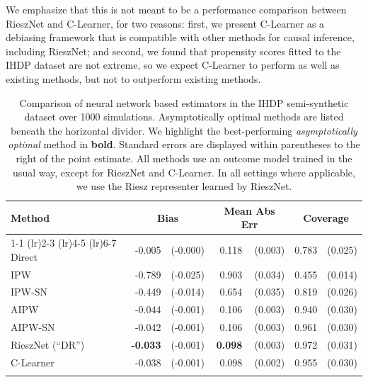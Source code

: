 We emphasize that this is not meant to be a performance comparison between RieszNet and C-Learner, for two reasons: first, we present C-Learner as a debiasing framework that is compatible with other methods for causal inference, including RieszNet; and second, we found that propensity scores fitted to the IHDP dataset are not extreme, so we expect C-Learner to perform as well as existing methods, but not to outperform existing methods. 

\begin{table}[H]
\centering
\footnotesize
\begin{tabular}{lrrrrrr}
\toprule
Method & \multicolumn{2}{c}{Bias} & \multicolumn{2}{c}{Mean Abs Err} & \multicolumn{2}{c}{Coverage} \\ 
\cmidrule(lr){1-1}
\cmidrule(lr){2-3}
\cmidrule(lr){4-5}
\cmidrule(lr){6-7}
Direct & -0.005 & (-0.000) & 0.118 & (0.003) & 0.783 & (0.025)\\
IPW & -0.789 & (-0.025) & 0.903 & (0.034) & 0.455 & (0.014)\\
IPW-SN & -0.449 & (-0.014) & 0.654 & (0.035) & 0.819 & (0.026)\\
\greymidrule
AIPW & -0.044 & (-0.001) & 0.106 & (0.003) & 0.940 & (0.030)\\
AIPW-SN & -0.042 & (-0.001) & 0.106 & (0.003) & 0.961 & (0.030)\\
RieszNet (``DR'') & \textbf{-0.033} & (-0.001) & \textbf{0.098} & (0.003) & 0.972 & (0.031)\\
C-Learner & -0.038 & (-0.001) & 0.098 & (0.002) & 0.955 & (0.030)\\
\bottomrule
\vspace{0.1em}
\end{tabular}
\caption{Comparison of neural network based estimators in the IHDP semi-synthetic dataset over 1000 simulations. Asymptotically optimal methods are listed beneath the horizontal divider. We highlight the best-performing \emph{asymptotically optimal} method in \textbf{bold}. Standard errors are displayed within parentheses to the right of the point estimate. All methods use an outcome model trained in the usual way, except for RieszNet and C-Learner. In all settings where applicable, we use the Riesz representer learned by RieszNet.}
\label{tb:ihdp_nn}
\end{table}

